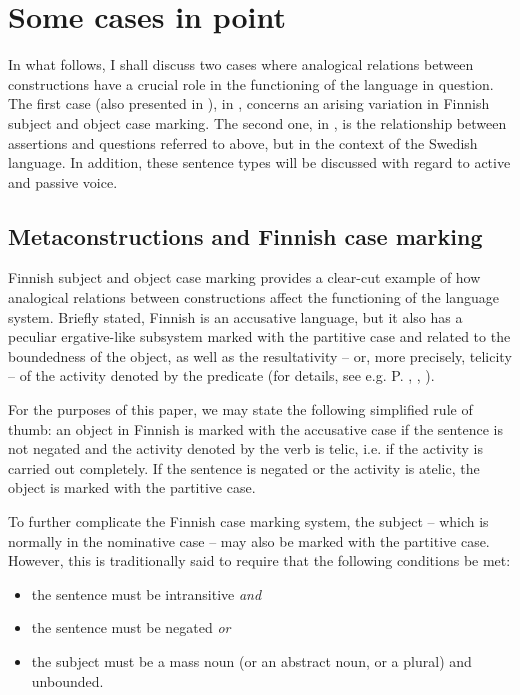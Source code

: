 \documentclass[output=paper, colorlinks,citecolor=brown]{langsci/langscibook}
\begin{document}
\section{Some cases in point} \label{leino_sec2}

In what follows, I shall discuss two cases where analogical relations between constructions have a crucial role in the functioning of the language in question. The first case (also presented in \citealt{LeinoÖstman2005}), in , concerns an arising variation in Finnish subject and object case marking. The second one, in , is the relationship between assertions and questions referred to above, but in the context of the Swedish language. In addition, these sentence types will be discussed with regard to active and passive voice.

\subsection{Metaconstructions and Finnish case marking}\label{sec:leino_2.1}

Finnish subject and object case marking provides a clear-cut example of how analogical relations between constructions affect the functioning of the language system. Briefly stated, Finnish is an accusative language, but it also has a peculiar ergative-like subsystem marked with the partitive case and related to the boundedness of the object, as well as the resultativity -- or, more precisely, telicity -- of the activity denoted by the predicate (for details, see e.g. P. \citealt{Leino1991}, \citealt{Karlsson1999}, \citealt{Heinämäki1984}).

For the purposes of this paper, we may state the following simplified rule of thumb: an object in Finnish is marked with the accusative case if the sentence is not negated and the activity denoted by the verb is telic, i.e. if the activity is carried out completely. If the sentence is negated or the activity is atelic, the object is marked with the partitive case.

To further complicate the Finnish case marking system, the subject -- which is normally in the nominative case -- may also be marked with the partitive case. However, this is traditionally said to require that the following conditions be met:

\begin{itemize}
\item the sentence must be intransitive \textit{and}
\item the sentence must be negated \textit{or}
\item the subject must be a mass noun (or an abstract noun, or a plural) and unbounded.
\end{itemize}
\end{document}
